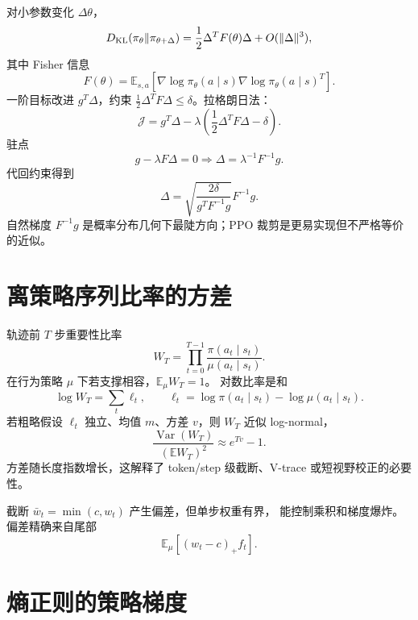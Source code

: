 \documentclass[11pt]{article}
\numberwithin{equation}{section}
\newcommand{\E}{\mathbb{E}}
\newcommand{\1}{\mathbf{1}}
\newcommand{\Var}{\operatorname{Var}}
\begin{document}
对小参数变化 $\Delta\theta$，
\begin{equation}
 D_{\rm KL}(\pi_{\theta}\|\pi_{\theta+\Delta})
 =\frac12\Delta^TF(\theta)\Delta+O(\|\Delta\|^3),
\end{equation}
其中 Fisher 信息
\begin{equation}
 F(\theta)=\E_{s,a}
 [\nabla\log\pi_\theta(a\mid s)
 \nabla\log\pi_\theta(a\mid s)^T].
\end{equation}
一阶目标改进 $g^T\Delta$，约束
$\frac12\Delta^TF\Delta\le\delta$。拉格朗日法：
\begin{equation}
 \mathcal J=g^T\Delta-\lambda
 \left(\frac12\Delta^TF\Delta-\delta\right).
\end{equation}
驻点
\begin{equation}
 g-\lambda F\Delta=0
 \Rightarrow \Delta=\lambda^{-1}F^{-1}g.
\end{equation}
代回约束得到
\begin{equation}
 \boxed{\Delta=\sqrt{\frac{2\delta}{g^TF^{-1}g}}F^{-1}g.}
\end{equation}
自然梯度 $F^{-1}g$ 是概率分布几何下最陡方向；PPO 裁剪是更易实现但不严格等价的近似。

\section{离策略序列比率的方差}

轨迹前 $T$ 步重要性比率
\begin{equation}
 W_T=\prod_{t=0}^{T-1}
 \frac{\pi(a_t\mid s_t)}{\mu(a_t\mid s_t)}.
\end{equation}
在行为策略 $\mu$ 下若支撑相容，$\E_\mu W_T=1$。
对数比率是和
\begin{equation}
 \log W_T=\sum_t\ell_t,\qquad
 \ell_t=\log\pi(a_t\mid s_t)-\log\mu(a_t\mid s_t).
\end{equation}
若粗略假设 $\ell_t$ 独立、均值 $m$、方差 $v$，则
$W_T$ 近似 log-normal，
\begin{equation}
 \frac{\Var(W_T)}{(\E W_T)^2}\approx e^{Tv}-1.
\end{equation}
方差随长度指数增长，这解释了 token/step 级截断、V-trace 或短视野校正的必要性。

截断 $\bar w_t=\min(c,w_t)$ 产生偏差，但单步权重有界，
能控制乘积和梯度爆炸。偏差精确来自尾部
\begin{equation}
 \E_\mu[(w_t-c)_+f_t].
\end{equation}

\section{熵正则的策略梯度}
\end{document}
